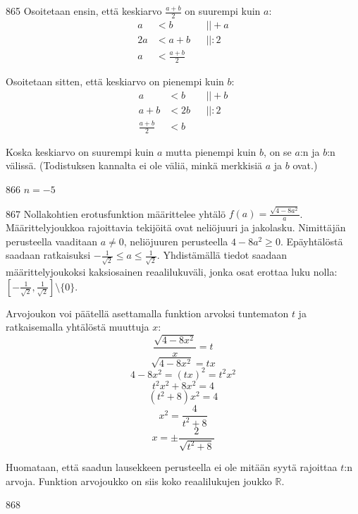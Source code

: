 \begin{Vastaus}{865}
	Osoitetaan ensin, että keskiarvo $\frac{a+b}{2}$ on suurempi kuin $a$:
	\begin{align*}
	a&<b && ||+a \\
	2a&<a+b && ||:2 \\
	a&<\frac{a+b}{2} &&
	\end{align*}

	Osoitetaan sitten, että keskiarvo on pienempi kuin $b$:
	\begin{align*}
	a&<b && ||+b \\
	a+b&<2b && ||:2 \\
	\frac{a+b}{2}&<b &&
	\end{align*}

	Koska keskiarvo on suurempi kuin $a$ mutta pienempi kuin $b$, on se $a$:n ja $b$:n välissä. (Todistuksen kannalta ei ole väliä, minkä merkkisiä $a$ ja $b$ ovat.)
	
\end{Vastaus}
\begin{Vastaus}{866}
	$n=-5$
	
\end{Vastaus}
\begin{Vastaus}{867}
	Nollakohtien erotusfunktion määrittelee yhtälö $f(a)=\frac{\sqrt{4-8a^2}}{a}$. Määrittelyjoukkoa rajoittavia tekijöitä ovat neliöjuuri ja jakolasku. Nimittäjän perusteella vaaditaan $a\neq 0$, neliöjuuren perusteella $4-8a^2\geq 0$. Epäyhtälöstä saadaan ratkaisuksi $-\frac{1}{\sqrt{2}}\leq a \leq \frac{1}{\sqrt{2}}$. Yhdistämällä tiedot saadaan määrittelyjoukoksi kaksiosainen reaalilukuväli, jonka osat erottaa luku nolla: $[-\frac{1}{\sqrt{2}},\frac{1}{\sqrt{2}}] \setminus \lbrace 0 \rbrace$. %

Arvojoukon voi päätellä asettamalla funktion arvoksi tuntematon $t$ ja ratkaisemalla yhtälöstä muuttuja $x$:
	$$\frac{\sqrt{4-8x^2}}{x}=t$$
	$$\sqrt{4-8x^2}=tx$$
	$$4-8x^2=(tx)^2=t^2x^2$$
	$$t^2x^2+8x^2=4$$
	$$(t^2+8)x^2=4$$
	$$x^2=\frac{4}{t^2+8}$$
	$$x=\pm \frac{2}{\sqrt{t^2+8}}$$

	Huomataan, että saadun lausekkeen perusteella ei ole mitään syytä rajoittaa $t$:n arvoja. Funktion arvojoukko on siis koko reaalilukujen joukko $\mathbb{R}$.
	
\end{Vastaus}
\begin{Vastaus}{868}
	
\end{Vastaus}
